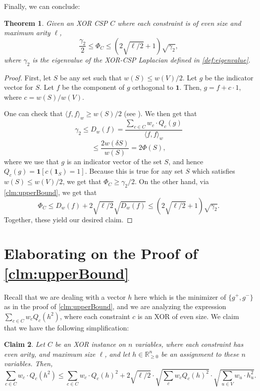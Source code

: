 \documentclass[11pt]{article}
\newtheorem{theorem}{Theorem}[section]
\newtheorem{claim}[theorem]{Claim}
\theoremstyle{definition}
\newcommand{\R}{\mathbb{R}}
\begin{document}
Finally, we can conclude:

\begin{theorem}
    Given an XOR CSP $C$ where each constraint is of even size and maximum arity $\ell$,
    \[
    \frac{\gamma_2}{2} \leq \Phi_C \leq \left (2 \sqrt{\ell/2} + 1 \right) \sqrt{\gamma_2},
    \]
    where $\gamma_2$ is the eigenvalue of the XOR-CSP Laplacian defined in \cref{def:eigenvalue}. 
\end{theorem}

\begin{proof}
    First, let $S$ be any set such that $w(S) \leq w(V) / 2$. Let $g$ be the indicator vector for $S$. Let $f$ be the component of $g$ orthogonal to $\mathbf{1}$. Then, $g = f + c \cdot 1$, where $c = w(S) / w(V)$.

    One can check that $\langle f, f \rangle_w \geq w(S) / 2$ (see \cite{CLTZ18}). We then get that 
    \[
    \gamma_2 \leq D_w(f) = \frac{\sum_{c \in C} w_c \cdot Q_c(g) }{\langle f, f \rangle_w}
    \]
    \[
    \leq \frac{2w(\delta S)}{w(S)} = 2 \Phi(S),
    \]
    where we use that $g$ is an indicator vector of the set $S$, and hence $Q_c(g) = \mathbf{1}[c(\mathbf{1}_S) = 1]$.
    Because this is true for any set $S$ which satisfies $w(S) \leq w(V) / 2$, we get that $\Phi_C \geq \gamma_2 / 2$. On the other hand, via \cref{clm:upperBound}, we get that 
    \[
    \Phi_C \leq D_w(f) + 2 \sqrt{\ell/2}\sqrt{D_w(f)} \leq (2 \sqrt{\ell/2} + 1)\sqrt{\gamma_2}.
    \]
    Together, these yield our desired claim. 
\end{proof}




\appendix

\section{Elaborating on the Proof of \cref{clm:upperBound}}

Recall that we are dealing with a vector $h$ here which is the minimizer of $\{g^+, g^-\}$ as in the proof of \cref{clm:upperBound}, and we are analyzing the expression $\sum_{c \in C} w_c Q_c(h^2)$, where each constraint $c$ is an XOR of even size. We claim that we have the following simplification:

\begin{claim}\label{clm:simplificationProof}
    Let $C$ be an XOR instance on $n$ variables, where each constraint has even arity, and maximum size $\ell$, and let $h \in \R_{\geq 0}^n$ be an assignment to these $n$ variables. Then, 
    \[
    \sum_{c \in C} w_c \cdot Q_c(h^2) \leq \sum_{c \in C}  w_c \cdot Q_c(h)^2 + 2 \sqrt{\ell/2} \cdot \sqrt{\sum_c w_c Q_c(h)^2} \cdot \sqrt{\sum_{u \in V} w_u \cdot h_u^2}.
    \]
\end{claim}
\end{document}
